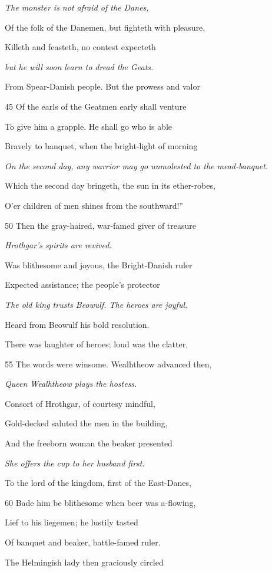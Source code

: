 \emph{The monster is not
afraid of the Danes,}

Of the folk of the Danemen, but fighteth with pleasure,

Killeth and feasteth, no contest expecteth

\emph{but he will soon
learn to dread the
Geats.}

From Spear-Danish people. But the prowess and valor

45
Of the earls of the Geatmen early shall venture

To give him a grapple. He shall go who is able

Bravely to banquet, when the bright-light of morning

\emph{On the second day,
any warrior may
go unmolested to
the mead-banquet.}

Which the second day bringeth, the sun in its ether-robes,

O’er children of men shines from the southward!”

50
Then the gray-haired, war-famed giver of treasure

\emph{Hrothgar’s spirits
are revived.}

Was blithesome and joyous, the Bright-Danish ruler

Expected assistance; the people’s protector

\emph{The old king trusts
Beowulf.
The heroes are
joyful.}

Heard from Beowulf his bold resolution.

There was laughter of heroes; loud was the clatter,

55
The words were winsome. Wealhtheow advanced then,

\emph{Queen Wealhtheow
plays the
hostess.}

Consort of Hrothgar, of courtesy mindful,

Gold-decked saluted the men in the building,

And the freeborn woman the beaker presented

\emph{She offers the cup
to her husband
first.}

To the lord of the kingdom, first of the East-Danes,

60
Bade him be blithesome when beer was a-flowing,

Lief to his liegemen; he lustily tasted

Of banquet and beaker, battle-famed ruler.

The Helmingish lady then graciously circled

